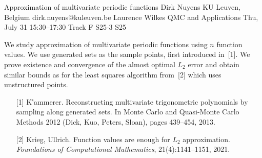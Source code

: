 \begin{talk}
  {Approximation of multivariate periodic functions}%
  {Dirk Nuyens}%
  {KU Leuven, Belgium}%
  {dirk.nuyens@kuleuven.be}%
  {Laurence Wilkes}%
  {QMC and Applications}%
  {Thu, July 31 15:30–17:30 Track F}%
  {S25-3}%
  {S25}%
				
			
  We study approximation of multivariate periodic functions using $n$
  function values. We use generated sets as the sample points, first
  introduced in~[1]. We prove existence and convergence of the almost
  optimal $L_2$ error and obtain similar bounds as for the least squares
  algorithm from~[2] which uses unstructured points.

\medskip

\begin{enumerate}
  \item[{[1]}]
    K{\''a}mmerer.
    Reconstructing multivariate trigonometric polynomials by sampling along generated sets.
    In Monte Carlo and Quasi-Monte Carlo Methods 2012 (Dick, Kuo, Peters, Sloan), pages 439--454, 2013.
  \item[{[2]}]
    Krieg, Ullrich.
    Function values are enough for $L_2$ approximation.
    \emph{Foundations of Computational Mathematics}, 21(4):1141--1151, 2021.
\end{enumerate}

\end{talk}

